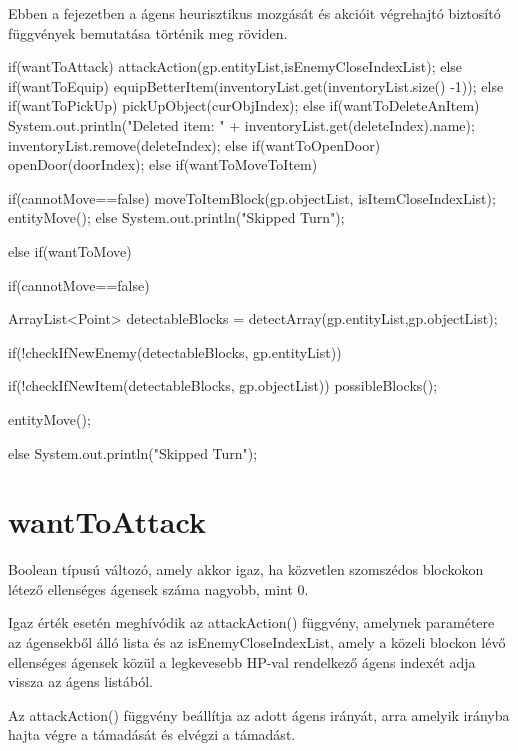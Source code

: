 
Ebben a fejezetben a ágens heurisztikus mozgását és akcióit végrehajtó biztosító függvények bemutatása történik meg röviden.

\begin{java}
    if(wantToAttack) {
        attackAction(gp.entityList,isEnemyCloseIndexList);
    }else if(wantToEquip) {			
        equipBetterItem(inventoryList.get(inventoryList.size()
        -1));
    }else if(wantToPickUp) {
        pickUpObject(curObjIndex);
    }else if(wantToDeleteAnItem) {
        System.out.println("Deleted item: "
            + inventoryList.get(deleteIndex).name);
        inventoryList.remove(deleteIndex);
    }else if(wantToOpenDoor) {
        openDoor(doorIndex);
    }else if(wantToMoveToItem) {
        if(cannotMove==false) {
            moveToItemBlock(gp.objectList,
            isItemCloseIndexList);
            entityMove();
        } else System.out.println("Skipped Turn");

    }else if(wantToMove) {
        if(cannotMove==false) {
            
            ArrayList<Point> detectableBlocks =
                 detectArray(gp.entityList,gp.objectList);

            if(!checkIfNewEnemy(detectableBlocks,
            gp.entityList)) {
                if(!checkIfNewItem(detectableBlocks,
                gp.objectList)) {
                    possibleBlocks();
                }
                
            }
            
            entityMove();
        } else System.out.println("Skipped Turn");


    }
\end{java}

\section{wantToAttack}

Boolean típusú változó, amely akkor igaz, ha közvetlen szomszédos blockokon létező
ellenséges ágensek száma nagyobb, mint 0.

Igaz érték esetén meghívódik az attackAction() függvény, amelynek paramétere az ágensekből álló lista és 
az isEnemyCloseIndexList, amely a közeli blockon lévő ellenséges ágensek közül a legkevesebb
HP-val rendelkező ágens indexét adja vissza az ágens listából.

Az attackAction() függvény beállítja az adott ágens irányát, arra amelyik irányba hajta végre a támadását és 
elvégzi a támadást.


